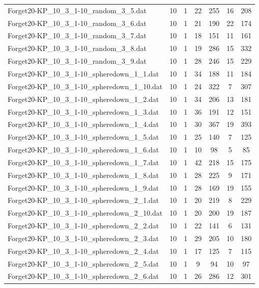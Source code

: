 \begin{table}[!ht]
\begin{tabular}{lcccccc}
Forget20-KP\_10\_3\_1-10\_random\_3\_5.dat & 10 & 1 & 22 & 255 & 16 & 208 \\
Forget20-KP\_10\_3\_1-10\_random\_3\_6.dat & 10 & 1 & 21 & 190 & 22 & 174 \\
Forget20-KP\_10\_3\_1-10\_random\_3\_7.dat & 10 & 1 & 18 & 151 & 11 & 161 \\
Forget20-KP\_10\_3\_1-10\_random\_3\_8.dat & 10 & 1 & 19 & 286 & 15 & 332 \\
Forget20-KP\_10\_3\_1-10\_random\_3\_9.dat & 10 & 1 & 28 & 246 & 15 & 229 \\
Forget20-KP\_10\_3\_1-10\_spheredown\_1\_1.dat & 10 & 1 & 34 & 188 & 11 & 184 \\
Forget20-KP\_10\_3\_1-10\_spheredown\_1\_10.dat & 10 & 1 & 24 & 322 & 7 & 307 \\
Forget20-KP\_10\_3\_1-10\_spheredown\_1\_2.dat & 10 & 1 & 34 & 206 & 13 & 181 \\
Forget20-KP\_10\_3\_1-10\_spheredown\_1\_3.dat & 10 & 1 & 36 & 191 & 12 & 151 \\
Forget20-KP\_10\_3\_1-10\_spheredown\_1\_4.dat & 10 & 1 & 30 & 367 & 19 & 393 \\
Forget20-KP\_10\_3\_1-10\_spheredown\_1\_5.dat & 10 & 1 & 25 & 140 & 7 & 125 \\
Forget20-KP\_10\_3\_1-10\_spheredown\_1\_6.dat & 10 & 1 & 10 & 98 & 5 & 85 \\
Forget20-KP\_10\_3\_1-10\_spheredown\_1\_7.dat & 10 & 1 & 42 & 218 & 15 & 175 \\
Forget20-KP\_10\_3\_1-10\_spheredown\_1\_8.dat & 10 & 1 & 28 & 225 & 9 & 171 \\
Forget20-KP\_10\_3\_1-10\_spheredown\_1\_9.dat & 10 & 1 & 28 & 169 & 19 & 155 \\
Forget20-KP\_10\_3\_1-10\_spheredown\_2\_1.dat & 10 & 1 & 20 & 219 & 8 & 229 \\
Forget20-KP\_10\_3\_1-10\_spheredown\_2\_10.dat & 10 & 1 & 20 & 200 & 19 & 187 \\
Forget20-KP\_10\_3\_1-10\_spheredown\_2\_2.dat & 10 & 1 & 22 & 141 & 6 & 131 \\
Forget20-KP\_10\_3\_1-10\_spheredown\_2\_3.dat & 10 & 1 & 29 & 205 & 10 & 180 \\
Forget20-KP\_10\_3\_1-10\_spheredown\_2\_4.dat & 10 & 1 & 17 & 125 & 7 & 115 \\
Forget20-KP\_10\_3\_1-10\_spheredown\_2\_5.dat & 10 & 1 & 9 & 94 & 10 & 97 \\
Forget20-KP\_10\_3\_1-10\_spheredown\_2\_6.dat & 10 & 1 & 26 & 286 & 12 & 301 \\

\end{tabular}
\end{table}
